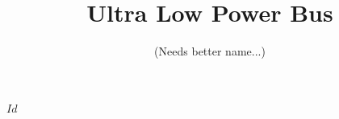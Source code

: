 \documentclass{article}
\newcommand{\bus}{ULPB\xspace}
\begin{document}
\svnInfo $Id$ 

\pagestyle{fancyplain}

\title{Ultra Low Power Bus}
\author{(Needs better name...)}
\date{}
\maketitle

\tableofcontents
\clearpage


\begin{comment}
\clearpage




\clearpage


\clearpage
\section{Document Revision History}
\label{sec:revisions}

\begin{itemize}

\item Revision 0.4 {\footnotesize(r2850)} -- Jan 22, 2012
\subitem Begin to address Reset issues

\item Revision 0.3 {\footnotesize(r2746)} -- Jan 10, 2012
\subitem Commit to 4-pulse design, update accordingly
\subitem Add TODO section of new considerations / issues

\item Revision 0.2 {\footnotesize(r2697)} -- Jan 5, 2012
\subitem Add skeleton of design considerations / requirements
\subitem Add discussion of \bus states, state diagram
\subitem Several clarifications

\item Revision 0.1 {\footnotesize(r2653)} -- Dec 19, 2012
\subitem Initial revision

\end{itemize}

\clearpage
\appendix
\section{Other MES, ACK, RST Designs}
\label{sec:appendix-reset}



\end{comment}
\end{document}
